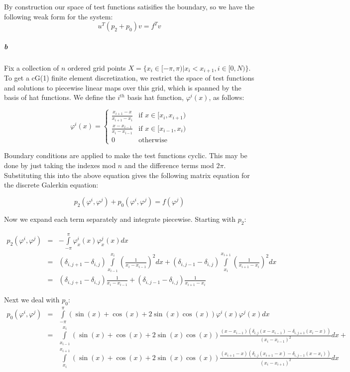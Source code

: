 \documentclass{article}
\begin{document}
By construction our space of test functions satisifies the boundary, so we have the following weak form for the system:
\[ u^T (p_2 + p_0) v = f^T v \]

\subparagraph{b}

Fix a collection of $n$ ordered grid points $X = \{ x_i \in [-\pi, \pi) | x_i < x_{i+1}, i \in [0,N) \}$.  To get a cG(1) finite element discretization, we restrict the space of test functions and solutions to piecewise linear maps over this grid, which is spanned by the basis of hat functions.  We define the $i^{th}$ basis hat function, $\varphi^i(x)$, as follows:

\[ \varphi^i(x) = \left \{ \begin{array}{cc}
\frac{x_{i+1} - x}{x_{i+1} - x_{i}} & \textrm{if } x \in [x_{i},   x_{i+1}) \\
\frac{x - x_{i-1}}{x_{i} - x_{i-1}} & \textrm{if } x \in [x_{i-1}, x_{i})   \\
0 & \textrm{otherwise}
\end{array} \right. \]

Boundary conditions are applied to make the test functions cyclic.  This may be done by just taking the indexes mod $n$ and the difference terms mod $2 \pi$.  Substituting this into the above equation gives the following matrix equation for the discrete Galerkin equation:

\[ p_2(\varphi^i, \varphi^j) + p_0(\varphi^i, \varphi^j) = f(\varphi^j) \]

Now we expand each term separately and integrate piecewise.  Starting with $p_2$:

\begin{eqnarray*}
p_2(\varphi^i, \varphi^j) & = & - \int \limits_{-\pi}^{\pi} \varphi^i_x(x) \varphi^j_x(x) dx \\
& = & \left( \delta_{i,j+1} - \delta_{i,j} \right) \int \limits_{x_{i-1}}^{x_{i}} \left( \frac{1}{x_{i} - x_{i-1}} \right)^2 dx 
+ \left( \delta_{i,j-1} - \delta_{i,j} \right) \int \limits_{x_{i}}^{x_{i+1}}  \left( \frac{1}{x_{i+1} - x_{i}} \right)^2 dx \\
& = & \left( \delta_{i,j+1} - \delta_{i,j} \right) \frac{1}{x_{i} - x_{i-1}} 
+ \left( \delta_{i,j-1} - \delta_{i,j} \right) \frac{1}{x_{i+1} - x_{i}}
\end{eqnarray*}

Next we deal with $p_0$:
\begin{eqnarray*}
p_0(\varphi^i, \varphi^j) & = & \int \limits_{-\pi}^{\pi} \left( \sin(x) + \cos(x) + 2 \sin(x) \cos(x) \right) \varphi^i(x) \varphi^j(x) dx\\
 & = & 
\int \limits_{x_{i-1}}^{x_i} \left( \sin(x) + \cos(x) + 2 \sin(x) \cos(x) \right) \frac{ (x - x_{i-1}) (\delta_{i,j} (x - x_{i-1}) - \delta_{i,j+1}(x_i - x)) }{\left(x_{i} - x_{i-1}\right)^2} dx + \\
& & \int \limits_{x_{i}}^{x_{i+1}} \left( \sin(x) + \cos(x) + 2 \sin(x) \cos(x) \right) \frac{ (x_{i+1} - x) (\delta_{i,j} (x_{i+1} - x) - \delta_{i,j-1}(x - x_i))}{\left(x_{i} - x_{i+1}\right)^2} dx
\end{eqnarray*}
\end{document}
